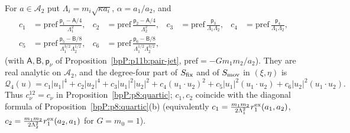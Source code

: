 \begin{theorem}\label{bpP:p11b:quartic-explicit}
For $a\in\mathcal A_2$ put $\Lambda_i=m_i\sqrt{\kappa a_i}$, $\alpha=a_1/a_2$, and
\begin{align*}
c_1&=\mathrm{pref}\,\frac{\mathsf p_1-\mathsf A/4}{\Lambda_1^2},& c_2&=\mathrm{pref}\,\frac{\mathsf p_2-\mathsf A/4}{\Lambda_2^2},& c_3&=\mathrm{pref}\,\frac{\mathsf p_3}{\Lambda_1\Lambda_2},& c_4&=\mathrm{pref}\,\frac{\mathsf p_4}{\Lambda_1\Lambda_2},\\
c_5&=\mathrm{pref}\,\frac{\mathsf p_5-\mathsf B/8}{\Lambda_1^{3/2}\Lambda_2^{1/2}},& c_6&=\mathrm{pref}\,\frac{\mathsf p_6-\mathsf B/8}{\Lambda_1^{1/2}\Lambda_2^{3/2}},
\end{align*}
(with $\mathsf A,\mathsf B,\mathsf p_\nu$ of Proposition~\ref{bpP:p11b:pair-jet}, $\mathrm{pref}=-Gm_1m_2/a_2$). They are real analytic on $\mathcal A_2$, and the degree-four part of $S_{\rm fix}$ and of $S_{\rm mov}$ in $(\xi,\eta)$ is
\[\mathcal Q_4(u)=c_1|u_1|^4+c_2|u_2|^4+c_3|u_1|^2|u_2|^2+c_4(u_1\cdot u_2)^2+c_5|u_1|^2(u_1\cdot u_2)+c_6|u_2|^2(u_1\cdot u_2).\]
Thus $c_\nu^{12}=c_\nu$ in Proposition~\ref{bpP:p8:quartic}; $c_1,c_2$ coincide with the diagonal formula of Proposition~\ref{bpP:p8:quartic}(b) (equivalently $c_1=\frac{m_1m_2}{2\Lambda_1^2}r_1^{\rm ex}(a_1,a_2)$, $c_2=\frac{m_1m_2}{2\Lambda_2^2}r_1^{\rm ex}(a_2,a_1)$ for $G=m_0=1$).
\end{theorem}
